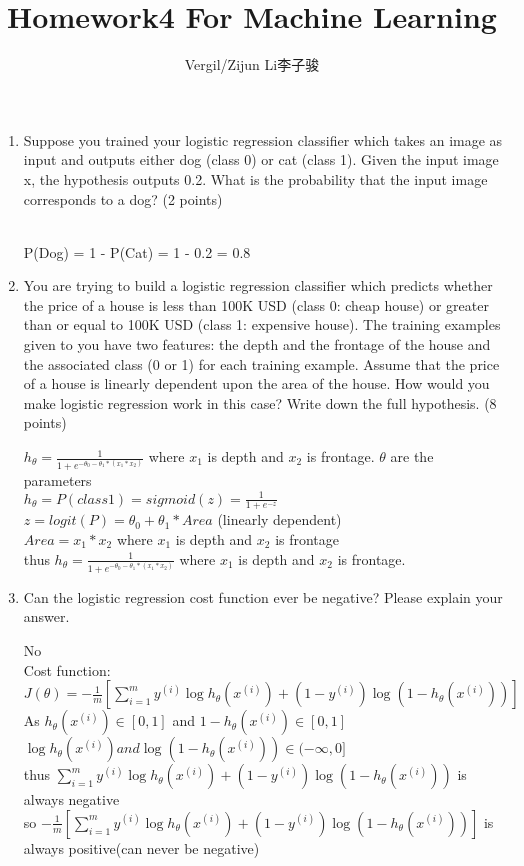 \documentclass[a4paper]{article}
\author{Vergil/Zijun Li李子骏}
\title{Homework4 For Machine Learning}
\date{\vspace{-5ex}}
\begin{document}
\maketitle

\bf\begin{enumerate}

    \item Suppose you trained your logistic regression classifier which takes an image as input and
    outputs either dog (class 0) or cat (class 1). Given the input image x, the hypothesis outputs 0.2.
    What is the probability that the input image corresponds to a dog? (2 points)

    { \\
    P(Dog) = 1 - P(Cat) = 1 - 0.2 = 0.8}

    \item You are trying to build a logistic regression classifier which predicts whether the price of a
    house is less than 100K USD (class 0: cheap house) or greater than or equal to 100K USD (class 1:
    expensive house). The training examples given to you have two features: the depth and the
    frontage of the house and the associated class (0 or 1) for each training example. Assume that the
    price of a house is linearly dependent upon the area of the house. How would you make logistic
    regression work in this case? Write down the full hypothesis. (8 points)

    {\normalfont $h_\theta = \frac{1}{1+e^{-\theta_0-\theta_1*(x_1*x_2)}}$ where $x_1$ is depth and $x_2$ is frontage. $\theta$ are the parameters\\
    $h_\theta = P(class 1) = sigmoid(z) = \frac{1}{1+e^{-z}}$\\
    $z = logit(P) = \theta_0 + \theta_1 * Area$ (linearly dependent)\\
    $Area = x_1 * x_2$ where $x_1$ is depth and $x_2$ is frontage\\
    thus $h_\theta = \frac{1}{1+e^{-\theta_0-\theta_1*(x_1*x_2)}}$ where $x_1$ is depth and $x_2$ is frontage.}

    \item  Can the logistic regression cost function ever be negative? Please explain your answer.

    {\normalfont No\\
    Cost function: $J(\theta) = -\frac{1}{m}[\sum\limits^m_{i=1}y^{(i)}\log h_\theta(x^{(i)}) + (1-y^{(i)}) \log(1-h_\theta(x^{(i)}))]$\\
    As $h_\theta(x^{(i)}) \in [0, 1]$ and $1 - h_\theta(x^{(i)}) \in [0, 1]$\\
    $\log h_\theta(x^{(i)}) and \log(1-h_\theta(x^{(i)})) \in (-\infty, 0]$ \\
    thus $\sum\limits^m_{i=1}y^{(i)}\log h_\theta(x^{(i)}) + (1-y^{(i)}) \log(1-h_\theta(x^{(i)}))$ is always negative\\
    so $-\frac{1}{m}[\sum\limits^m_{i=1}y^{(i)}\log h_\theta(x^{(i)}) + (1-y^{(i)}) \log(1-h_\theta(x^{(i)}))]$ is always positive(can never be negative)}


\end{enumerate}
\end{document}
